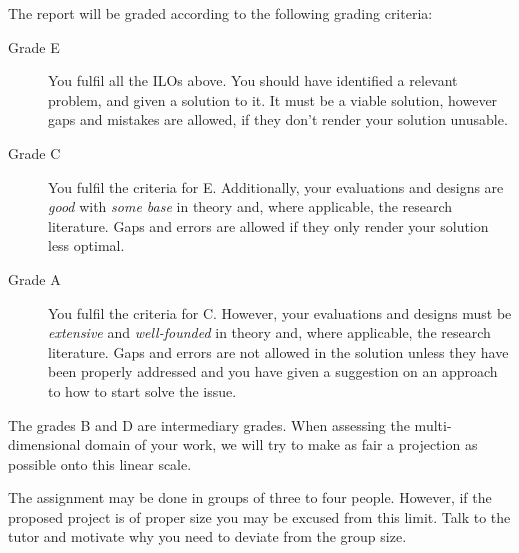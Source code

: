 The report will be graded according to the following grading criteria:
\begin{description}
  \item[Grade E] You fulfil all the \acp{ILO} above.
    You should have identified a relevant problem, and given a solution to it.
    It must be a viable solution, however gaps and mistakes are allowed, if 
    they don't render your solution unusable.

  \item[Grade C] You fulfil the criteria for E.
    Additionally, your evaluations and designs are \emph{good} with \emph{some 
      base} in theory and, where applicable, the research literature.
    Gaps and errors are allowed if they only render your solution less optimal.

  \item[Grade A] You fulfil the criteria for C.
    However, your evaluations and designs must be \emph{extensive} and 
    \emph{well-founded} in theory and, where applicable, the research 
    literature.
    Gaps and errors are not allowed in the solution unless they have been 
    properly addressed and you have given a suggestion on an approach to how to 
    start solve the issue.
\end{description}
The grades B and D are intermediary grades.
When assessing the multi-dimensional domain of your work, we will try to make 
as fair a projection as possible onto this linear scale.

The assignment may be done in groups of three to four people.
However, if the proposed project is of proper size you may be excused from this 
limit.
Talk to the tutor and motivate why you need to deviate from the group size.


\printbibliography
